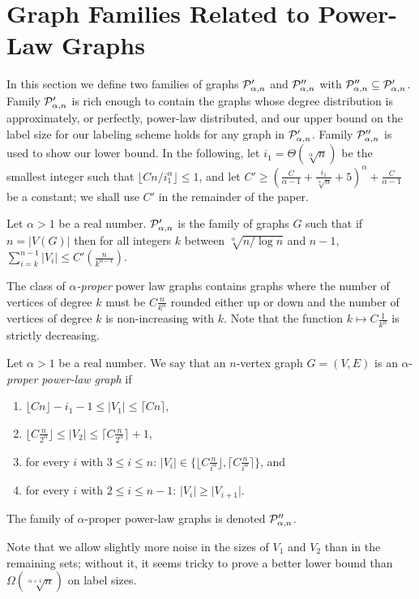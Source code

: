 
 \section{Graph Families Related to Power-Law Graphs}\label{Sec:GraphFamilies}
In this section we define two families of graphs $ \mathcal{P}'_{\alpha,n}$ and $ \mathcal{P}''_{\alpha,n}$ with $ \mathcal{P}''_{\alpha,n}\subseteq \mathcal{P}'_{\alpha,n}$. Family $ \mathcal{P}'_{\alpha,n}$ is rich enough to contain the graphs whose degree distribution is approximately, or perfectly, power-law distributed, and our upper bound on the label size for our labeling scheme holds for any graph in $ \mathcal{P}'_{\alpha,n}$. Family $ \mathcal{P}''_{\alpha,n}$ is used to show our lower bound. In the following, let $i_1 = \Theta(\sqrt[\alpha]n)$ be the smallest integer such that $\lfloor Cn/i_1^\alpha\rfloor \leq 1$, and let $C'\geq(\frac C{\alpha-1} + \frac{i_1}{\sqrt[\alpha] n} + 5)^{\alpha} + \frac{C}{\alpha - 1}$ be a constant; we shall use $C'$ in the remainder of the paper.
\begin{definition} \label{def:general-family}
Let $\alpha > 1$ be a real number. $ \mathcal{P}'_{\alpha,n}$ is the family of graphs $G$ such that if $n = \vert V(G)\vert$ then for all integers $k$ between $\sqrt[\alpha]{n/\log n}$ and $n-1$, $\sum_{i = k}^{n-1} {\vert V_i\vert} \leq C'(\frac{n}{k^{\alpha-1}})$.
\end{definition}

The class of $\alpha$\emph{-proper} power law graphs contains graphs where  the number of vertices of degree $k$
must be $C \frac{n}{k^{\alpha}}$ rounded either up or down and the number of vertices of degree $k$ is non-increasing
with $k$. Note that the function $k \mapsto  C \frac{1}{k^{\alpha}}$ is strictly decreasing.
 
\begin{definition}\label{def:proper}
Let $\alpha > 1$ be a real number. We say that an $n$-vertex graph  $G=(V,E)$ is an  $\alpha$-\emph{proper power-law graph} 
if
\begin{enumerate}
\item $\lfloor Cn\rfloor - i_1 - 1\leq\vert V_1\vert\leq\lceil Cn\rceil$,
\item $\lfloor C\frac n{2^\alpha}\rfloor\leq\vert V_2\vert\leq\lceil C\frac n{2^\alpha}\rceil + 1$,
\item for every $i$ with $3 \leq i \leq n$:  $\vert V_i \vert\in \{\lfloor C\frac{n}{i^{\alpha}} \rfloor, \lceil C \frac{n}{i^{\alpha}} \rceil\}$, and
\item for every $i$ with $2 \leq i \leq n-1$: $\vert V_i \vert \geq \vert V_{i+1} \vert$.
\end{enumerate}
The family of $\alpha$-proper power-law graphs is denoted $ \mathcal{P}''_{\alpha,n}$.
\end{definition}
Note that we allow slightly more noise in the sizes of $V_1$ and $V_2$ than in the remaining sets; without it, it seems tricky to prove a better lower bound than $\Omega(\sqrt[\alpha+1]{n})$ on label sizes.

